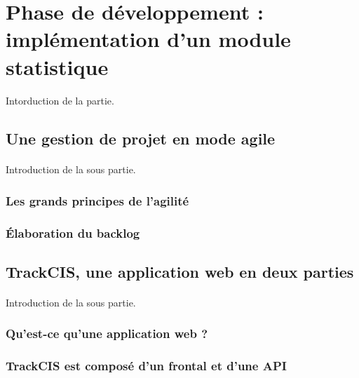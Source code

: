 \newpage
\section{Phase de développement : implémentation d'un module statistique}
	\paragraph{}
	Intorduction de la partie.
	
	\subsection{Une gestion de projet en mode agile}
		\paragraph{}
		Introduction de la sous partie.
		
		\subsubsection{Les grands principes de l'agilité}
		\subsubsection{Élaboration du backlog}
	
	\subsection{TrackCIS, une application web en deux parties}
		\paragraph{}
		Introduction de la sous partie.
		
		\subsubsection{Qu'est-ce qu'une application web ?}
			\paragraph{}%
			
			\paragraph{}%
		\subsubsection{TrackCIS est composé d'un frontal et d'une API}
